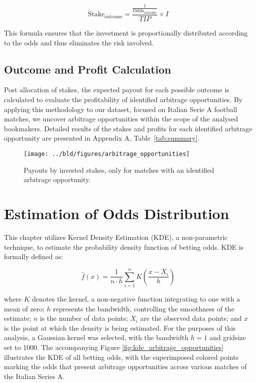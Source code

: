 \documentclass[11pt, a4paper, leqno]{article}
\begin{document}
\begin{equation}
    \text{Stake}_{\text{outcome}} = \frac{\frac{1}{\text{Odds}_{\text{outcome}}}}{TIP} \times I
\end{equation}

This formula ensures that the investment is proportionally distributed according to the odds and thus eliminates the risk involved.

\subsection{Outcome and Profit Calculation}
Post allocation of stakes, the expected payout for each possible outcome is calculated to evaluate the profitability of identified arbitrage opportunities. By applying this methodology to our dataset, focused on Italian Serie A football matches, we uncover arbitrage opportunities within the scope of the analysed bookmakers. Detailed results of the stakes and profits for each identified arbitrage opportunity are presented in Appendix A, Table~\ref{tab:summary}.

\begin{figure}[H]

    \centering
    \texttt{[image: ../bld/figures/arbitrage\_opportunities]}
    \caption{Payouts by invested stakes, only for matches with an identified arbitrage opportunity.}
    \label{fig:python-predictions}

\end{figure}

\section{Estimation of Odds Distribution}
\label{subsec:estimation_of_odds_distribution}

This chapter utilizes Kernel Density Estimation (KDE), a non-parametric technique, to estimate the probability density function of betting odds. KDE is formally defined as:

\begin{equation}
\hat{f}(x) = \frac{1}{n\cdot h} \sum_{i=1}^{n} K\left(\frac{x - X_i}{h}\right)
\end{equation}

where \(K\) denotes the kernel, a non-negative function integrating to one with a mean of zero; \(h\) represents the bandwidth, controlling the smoothness of the estimate; \(n\) is the number of data points; \(X_i\) are the observed data points; and \(x\) is the point at which the density is being estimated. For the purposes of this analysis, a Gaussian kernel was selected, with the bandwidth \(h = 1\) and gridsize set to 1000.
The accompanying Figure \ref{fig:kde_arbitrage_opportunities} illustrates the KDE of all betting odds, with the superimposed colored points marking the odds that present arbitrage opportunities across various matches of the Italian Series A.
\end{document}
